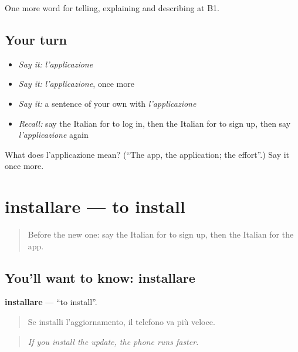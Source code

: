 \begin{grammarlens}[title={What you've built}]
One more word for telling, explaining and describing at B1.
\end{grammarlens}

\subsection*{Your turn}
\begin{itemize}
\raggedright
  \item \emph{Say it:} \emph{l'applicazione}
  \item \emph{Say it:} \emph{l'applicazione}, once more
  \item \emph{Say it:} a sentence of your own with \emph{l'applicazione}
  \item \emph{Recall:} say the Italian for to log in, then the Italian for to sign up, then say \emph{l'applicazione} again
\end{itemize}

\begin{tcolorbox}[breakable,colback=teal!4,colframe=teal!35!black,title={Before you move on}]
What does l'applicazione mean? (\textquotedblleft{}The app, the application; the effort\textquotedblright{}.) Say it once more.
\end{tcolorbox}
\section[installare]{installare — to install}

\label{lesson:IT-C400-installare}



\begin{quote}
Before the new one: say the Italian for to sign up, then the Italian for the app.
\end{quote}

\subsection*{You'll want to know: installare}
\textbf{installare} — \textquotedblleft{}to install\textquotedblright{}.

\begin{quote}
Se installi l'aggiornamento, il telefono va più veloce.
\end{quote}

\begin{quote}
\emph{If you install the update, the phone runs faster.}
\end{quote}

